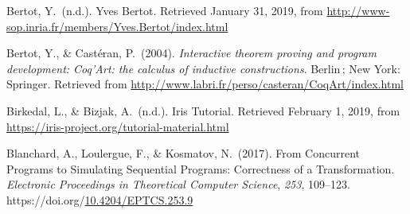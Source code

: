 \documentclass[12pt,twoside]{article}
\begin{document}
{\begin{thebibliography}{222}
\mdbibitemlabel{[Bertot, n.d.]}Bertot, Y.~(n.d.). Yves Bertot. Retrieved January 31, 2019, from \href{http://www-sop.inria.fr/members/Yves.Bertot/index.html}{{\ttfamily http://\hspace{0pt}www-\hspace{0pt}sop.\hspace{0pt}inria.\hspace{0pt}fr/\hspace{0pt}members/\hspace{0pt}Yves.\hspace{0pt}Bertot/\hspace{0pt}index.\hspace{0pt}html}}\label{bertot_yves_nodate}%

Bertot, Y., \& Castéran, P.~(2004). \emph{Interactive theorem proving and program development: Coq’Art: the calculus of inductive constructions}. Berlin ; New York: Springer. Retrieved from \href{http://www.labri.fr/perso/casteran/CoqArt/index.html}{{\ttfamily http://\hspace{0pt}www.\hspace{0pt}labri.\hspace{0pt}fr/\hspace{0pt}perso/\hspace{0pt}casteran/\hspace{0pt}CoqArt/\hspace{0pt}index.\hspace{0pt}html}}\label{bertot_interactive_2004}%

Birkedal, L., \& Bizjak, A.~(n.d.). Iris Tutorial. Retrieved February 1, 2019, from \href{https://iris-project.org/tutorial-material.html}{{\ttfamily https://\hspace{0pt}iris-\hspace{0pt}project.\hspace{0pt}org/\hspace{0pt}tutorial-\hspace{0pt}material.\hspace{0pt}html}}\label{birkedal_iris_nodate}%

Blanchard, A., Loulergue, F., \& Kosmatov, N.~(2017). From Concurrent Programs to Simulating Sequential Programs: Correctness of a Transformation. \emph{Electronic Proceedings in Theoretical Computer Science}, \emph{253}, 109–123. https://doi.org/\href{https://dx.doi.org/10.4204/EPTCS.253.9}{10.4204/EPTCS.253.9}\label{blanchard_concurrent_2017}%


\end{thebibliography}}
\end{document}
